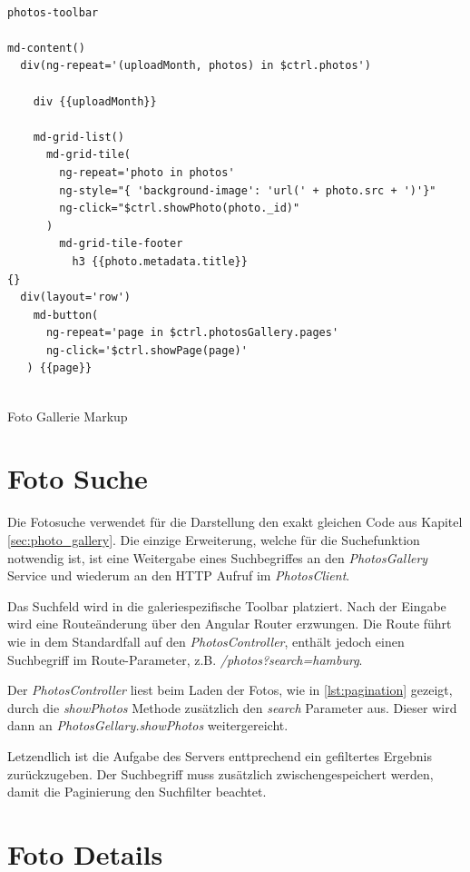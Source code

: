 \begin{listing}[H]
\begin{verbatim}

photos-toolbar

md-content()
  div(ng-repeat='(uploadMonth, photos) in $ctrl.photos')

    div {{uploadMonth}}

    md-grid-list()
      md-grid-tile(
        ng-repeat='photo in photos'
        ng-style="{ 'background-image': 'url(' + photo.src + ')'}"
        ng-click="$ctrl.showPhoto(photo._id)"
      )
        md-grid-tile-footer
          h3 {{photo.metadata.title}}
{}
  div(layout='row')
    md-button(
      ng-repeat='page in $ctrl.photosGallery.pages'
      ng-click='$ctrl.showPage(page)'
   ) {{page}}


\end{verbatim}
\caption{Foto Gallerie Markup}
\label{lst:photo_group_jade}
\end{listing}

\section{Foto Suche}

Die Fotosuche verwendet für die Darstellung den exakt gleichen Code aus Kapitel \ref{sec:photo_gallery}. Die einzige Erweiterung, welche für die Suchefunktion notwendig ist, ist eine Weitergabe eines Suchbegriffes an den \textit{PhotosGallery} Service und wiederum an den HTTP Aufruf im \textit{PhotosClient}.

Das Suchfeld wird in die galeriespezifische Toolbar platziert. Nach der Eingabe wird eine Routeänderung über den Angular Router erzwungen. Die Route führt wie in dem Standardfall auf den \textit{PhotosController}, enthält jedoch einen Suchbegriff im Route-Parameter, z.B. \textit{/photos?search=hamburg}.

Der \textit{PhotosController} liest beim Laden der Fotos, wie in \ref{lst:pagination} gezeigt, durch die \textit{showPhotos} Methode zusätzlich den
\textit{search} Parameter aus. Dieser wird dann an \textit{PhotosGellary.showPhotos} weitergereicht.

Letzendlich ist die Aufgabe des Servers enttprechend ein gefiltertes Ergebnis zurückzugeben. Der Suchbegriff muss zusätzlich zwischengespeichert werden, damit die Paginierung den Suchfilter beachtet.

\section{Foto Details}
\label{sec:photo_details}

